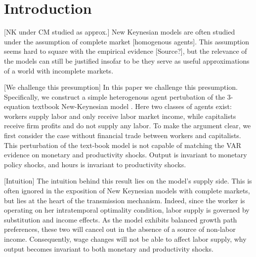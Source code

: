 \section{Introduction}

[NK under CM studied as approx.] New Keynesian models are often studied under the assumption of complete market [homogenous agents]. This assumption seems hard to square with the empirical evidence [Source?], but the relevance of the models can still be justified insofar to be they serve as useful approximations of a world with incomplete markets.

[We challenge this presumption] In this paper we challenge this presumption. Specifically, we construct a simple heterogenous agent pertubation of the 3-equation textbook New-Keynesian model \citep{Gali2009}. Here two classes of agents exist: workers supply labor and only receive labor market income, while capitalists receive firm profits and do not supply any labor. To make the argument clear, we first consider the case without financial trade between workers and capitalists. This perturbation of the text-book model is not capable of matching the VAR evidence on monetary and productivity shocks. Output is invariant to monetary policy shocks, and hours is invariant to productivity shocks.

[Intuition] The intuition behind this result lies on the model's supply side. This is often ignored in the exposition of New Keynesian models with complete markets, but lies at the heart of the transmission mechanism. Indeed, since the worker is operating on her intratemporal optimality condition, labor supply is governed by substitution and income effects. As the model exhibits balanced growth path preferences, these two will cancel out in the absence of a source of non-labor income. Consequently, wage changes will not be able to affect labor supply, why output becomes invariant to both monetary and productivity shocks.

